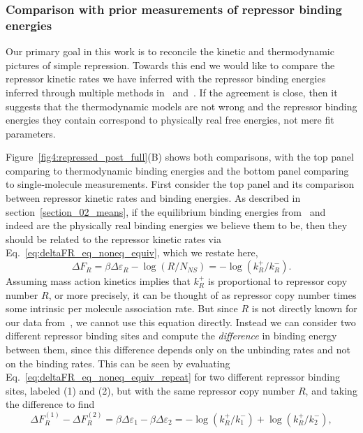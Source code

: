 \subsubsection{Comparison with prior measurements of repressor binding energies}
Our primary goal in this work is to reconcile the kinetic and thermodynamic
pictures of simple repression. Towards this end we would like to compare the
repressor kinetic rates we have inferred with the repressor binding energies
inferred through multiple methods in~\cite{Garcia2011a}
and~\cite{Razo-Mejia2018}. If the agreement is close, then it suggests that the
thermodynamic models are not wrong and the repressor binding energies they
contain correspond to physically real free energies, not mere fit parameters.

Figure~\ref{fig4:repressed_post_full}(B) shows both comparisons, with the top
panel comparing to thermodynamic binding energies and the bottom panel comparing
to single-molecule measurements. First consider the top panel and its comparison
between repressor kinetic rates and binding energies. As described in
section~\ref{section_02_means}, if the equilibrium binding energies
from~\cite{Garcia2011a} and~\cite{Razo-Mejia2018} indeed are the physically real
binding energies we believe them to be, then they should be related to the
repressor kinetic rates via Eq.~\ref{eq:deltaFR_eq_noneq_equiv}, which we
restate here,
\begin{equation}
\Delta F_R = \beta\Delta\varepsilon_R - \log(R/N_{NS})
        = - \log(k_R^+/k_R^-).
\label{eq:deltaFR_eq_noneq_equiv_repeat}
\end{equation}
Assuming mass action kinetics implies that $k_R^+$ is proportional to repressor
copy number $R$, or more precisely, it can be thought of as repressor copy
number times some intrinsic per molecule association rate. But since $R$ is not
directly known for our data from~\cite{Jones2014}, we cannot use this equation
directly. Instead we can consider two different repressor binding sites and
compute the \textit{difference} in binding energy between them, since this
difference depends only on the unbinding rates and not on the binding rates.
This can be seen by evaluating Eq.~\ref{eq:deltaFR_eq_noneq_equiv_repeat} for
two different repressor binding sites, labeled (1) and (2), but with the same
repressor copy number $R$, and taking the difference to find
\begin{equation}
\Delta F_R^{(1)} - \Delta F_R^{(2)}
= \beta\Delta\varepsilon_1 - \beta\Delta\varepsilon_2
= - \log(k_R^+/k_1^-) + \log(k_R^+/k_2^-),
\end{equation}
